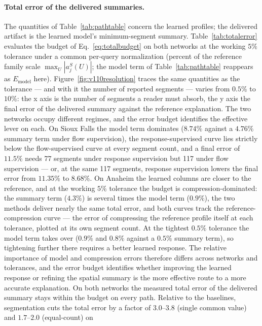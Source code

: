 \paragraph{Total error of the delivered summaries.}
The quantities of Table~\ref{tab:pathtable} concern the learned
profiles; the delivered artifact is the learned model's minimum-segment
summary. Table~\ref{tab:totalerror} evaluates the budget of
Eq.~\eqref{eq:totalbudget} on both networks at the working $5\%$
tolerance under a common per-query normalization (percent of the
reference family scale $\max_U|a^S_j(U)|$; the model term of
Table~\ref{tab:pathtable} reappears as $E_{\mathrm{model}}$ here).
Figure~\ref{fig:v110resolution} traces the same quantities as the
tolerance --- and with it the number of reported segments --- varies
from $0.5\%$ to $10\%$: the x axis is the number of segments a reader
must absorb, the y axis the final error of the delivered summary
against the reference explanation. The two networks occupy different
regimes, and the error budget identifies the effective lever on each.
On Sioux Falls the model term dominates ($8.74\%$ against a $4.76\%$
summary term under flow supervision), the response-supervised curve
lies strictly below the flow-supervised curve at every segment count,
and a final error of $11.5\%$ needs 77 segments under response
supervision but 117 under flow supervision --- or, at the same 117
segments, response supervision lowers the final error from $11.35\%$
to $8.68\%$. On Anaheim the learned
columns are closer to the reference, and at the working $5\%$ tolerance
the budget is compression-dominated: the summary term ($4.3\%$) is
several times the model term ($0.9\%$), the two methods deliver nearly
the same total error, and both curves track the reference-compression
curve --- the error of compressing the reference profile itself at each
tolerance, plotted at its own segment count. At the tightest $0.5\%$
tolerance the model term takes over ($0.9\%$ and $0.8\%$ against a
$0.5\%$ summary term), so tightening further there requires a better
learned response. The relative importance
of model and compression errors therefore differs across networks and
tolerances, and the error budget identifies whether improving the
learned response or
refining the spatial summary is the more effective route to a more
accurate explanation. On both networks the measured total error of the
delivered summary stays within the budget on every path. Relative to
the baselines, segmentation cuts the total error by a factor of
$3.0$--$3.8$ (single common value) and $1.7$--$2.0$ (equal-count) on
